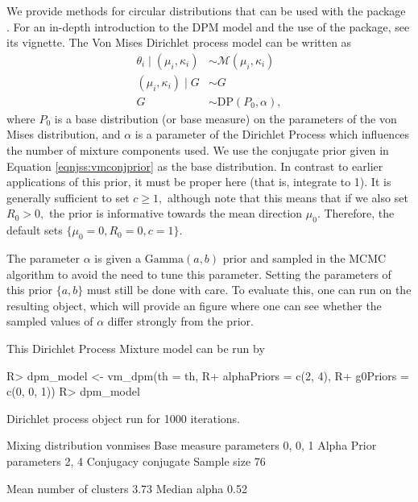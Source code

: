We provide methods for circular distributions that can be used with the
 package \citep{dirichletprocesspackage}. For an
in-depth introduction to the DPM model and the use of the
 package, see its vignette. The Von Mises
Dirichlet process model can be written as \begin{align}
\theta_i \mid (\mu_i, \kappa_i) &\sim \mathcal{M}(\mu_i, \kappa_i) \\
(\mu_i, \kappa_i) \mid G  &\sim G \\
G &\sim \text{DP}(P_0, \alpha),
\end{align} where \(P_0\) is a base distribution (or base measure) on
the parameters of the von Mises distribution, and \(\alpha\) is a
parameter of the Dirichlet Process which influences the number of
mixture components used. We use the conjugate prior given in Equation
\ref{eqnjss:vmconjprior} as the base distribution. In contrast to
earlier applications of this prior, it must be proper here (that is,
integrate to 1). It is generally sufficient to set \(c \geq 1,\)
although note that this means that if we also set \(R_0 > 0,\) the prior
is informative towards the mean direction \(\mu_0\). Therefore, the
default sets \(\{\mu_0 = 0, R_0 = 0, c = 1\}.\)

The parameter \(\alpha\) is given a \(\text{Gamma}(a, b)\) prior and
sampled in the MCMC algorithm to avoid the need to tune this parameter.
Setting the parameters of this prior \(\{a, b\}\) must still be done
with care. To evaluate this, one can run  on the
resulting object, which will provide an figure where one can see whether
the sampled values of \(\alpha\) differ strongly from the prior.

This Dirichlet Process Mixture model can be run by

\begin{CodeChunk}

\begin{CodeInput}
R> dpm_model <- vm_dpm(th = th, 
R+                     alphaPriors = c(2, 4), 
R+                     g0Priors = c(0, 0, 1))
R> dpm_model
\end{CodeInput}

\begin{CodeOutput}
Dirichlet process object run for 1000 iterations.
                                    
  Mixing distribution       vonmises
  Base measure parameters    0, 0, 1
  Alpha Prior parameters        2, 4
  Conjugacy                conjugate
  Sample size                     76
                                    
  Mean number of clusters       3.73
  Median alpha                  0.52
\end{CodeOutput}
\end{CodeChunk}

